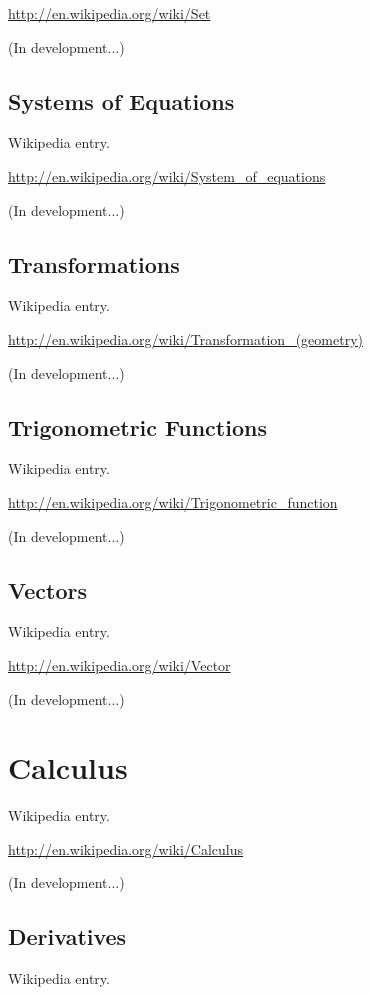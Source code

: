 \documentclass[12pt,twoside]{book}
\begin{document}
\href{http://en.wikipedia.org/wiki/Set}{http://en.wikipedia.org/wiki/Set}

(In development...)

\subsection[Systems of Equations]{Systems of
Equations}
Wikipedia entry.

\href{http://en.wikipedia.org/wiki/System_of_equations}{http://en.wikipedia.org/wiki/System\_of\_equations}

(In development...)

\subsection[Transformations]{Transformations}
Wikipedia entry.

\href{http://en.wikipedia.org/wiki/Transformation_(geometry)}{http://en.wikipedia.org/wiki/Transformation\_(geometry)}

(In development...)

\subsection[Trigonometric Functions]{
Trigonometric Functions}
Wikipedia entry.

\href{http://en.wikipedia.org/wiki/Trigonometric_function}{http://en.wikipedia.org/wiki/Trigonometric\_function}

(In development...)

\subsection[Vectors]{Vectors}
Wikipedia entry.

\href{http://en.wikipedia.org/wiki/Vector}{http://en.wikipedia.org/wiki/Vector}

(In development...)

\section[Calculus]{Calculus}
Wikipedia entry.

\href{http://en.wikipedia.org/wiki/Calculus}{http://en.wikipedia.org/wiki/Calculus}

(In development...)

\subsection[Derivatives]{Derivatives}
Wikipedia entry.
\end{document}
